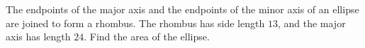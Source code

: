 The endpoints of the major axis and the endpoints of the minor axis of an ellipse are joined to form a rhombus. The rhombus has side length $13$, and the major axis has length $24$. Find the area of the ellipse.
